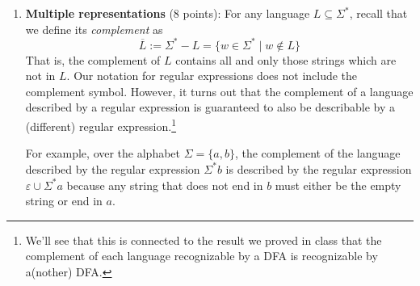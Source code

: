 \documentclass[12pt, oneside]{article}
\newcommand{\gradeCorrect}{({\it Graded for correctness}) }
\newcommand{\gradeComplete}{({\it Graded for completeness}) }
\begin{document}
\begin{enumerate}[wide, labelwidth=!, labelindent=0pt]
\begin{enumerate}
\begin{enumerate}
 
   \item \gradeComplete As a helpful tool in our construction\footnote{A result that is proved in 
   order to work towards a larger theorem is called a Lemma.}, prove that every NFA can be 
   converted to an equivalent one that has a single accept state. Note: this is exercise 1.11 in 
   the textbook.

   \item \gradeCorrect Prove that the collection of languages over $\{0,1\}$ that are each 
   recognizable by some NFA is closed under the $EXTEND$ operation. You can assume 
   that you are given a NFA with a single accept state $N = (Q, \{0,1\}, \delta, q_0, \{q_{acc}\})$
   and you need to define a new NFA, $N_{new} = (Q_{new}, \{0,1\}, \delta_{new}, q_{new}, F_{new})$,
    so that $L(N_{new}) = EXTEND(L(N))$. 

    A complete solution will include precise definitions for $Q_{new}, \delta_{new}, q_{new},$ and 
    $F_{new}$, as well as a 
    a brief justification 
    of your construction by explaining why these definitions work, referring 
    specifically to the definition of $EXTEND$ and to acceptance of NFA.

\end{enumerate}

\end{enumerate}
\item\textbf{Multiple representations} (8 points):
For any language $L \subseteq \Sigma^*$, recall that we define its \emph{complement} as 
$$\overline{L} := \Sigma^* - L = \{w \in \Sigma^* \mid w \notin L\}$$ That is, the complement of $L$ 
contains all and only those strings which are not in $L$. Our notation for regular expressions does not 
include the complement symbol. However, 
it turns out that the complement of a language described by a regular expression is guaranteed to also be describable by a 
(different) regular expression.\footnote{We'll see that this is connected to the 
result we proved in class that the complement of each language recognizable by a DFA is 
recognizable by a(nother) DFA.}

For example, over the alphabet $\Sigma = \{a,b\}$, the complement of the language described 
by the regular expression $\Sigma^* b$ is described by the regular expression $\varepsilon \cup \Sigma^*a$
because any string that does not end in $b$
must either be the empty string or end in $a$.


\end{enumerate}
\end{document}
